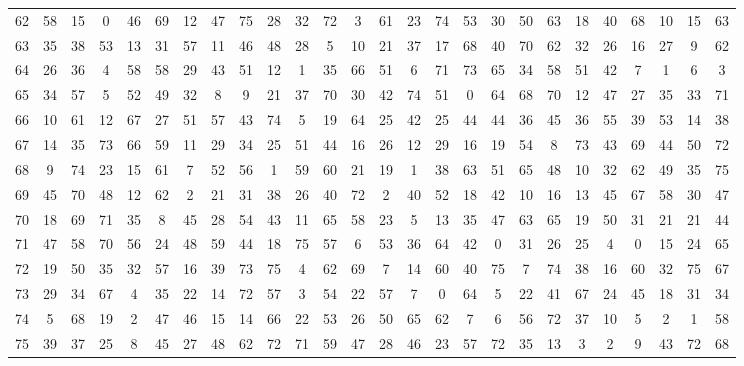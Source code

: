 \begin{table}
\begin{tabular}{c c c c c c c c c c c c c c c c c c c c c c c c c c }
62 & 58 & 15 & 0 & 46 & 69 & 12 & 47 & 75 & 28 & 32 & 72 & 3 & 61 & 23 & 74 & 53 & 30 & 50 & 63 & 18 & 40 & 68 & 10 & 15 & 63 \\
63 & 35 & 38 & 53 & 13 & 31 & 57 & 11 & 46 & 48 & 28 & 5 & 10 & 21 & 37 & 17 & 68 & 40 & 70 & 62 & 32 & 26 & 16 & 27 & 9 & 62 \\
64 & 26 & 36 & 4 & 58 & 58 & 29 & 43 & 51 & 12 & 1 & 35 & 66 & 51 & 6 & 71 & 73 & 65 & 34 & 58 & 51 & 42 & 7 & 1 & 6 & 3 \\
65 & 34 & 57 & 5 & 52 & 49 & 32 & 8 & 9 & 21 & 37 & 70 & 30 & 42 & 74 & 51 & 0 & 64 & 68 & 70 & 12 & 47 & 27 & 35 & 33 & 71 \\
66 & 10 & 61 & 12 & 67 & 27 & 51 & 57 & 43 & 74 & 5 & 19 & 64 & 25 & 42 & 25 & 44 & 44 & 36 & 45 & 36 & 55 & 39 & 53 & 14 & 38 \\
67 & 14 & 35 & 73 & 66 & 59 & 11 & 29 & 34 & 25 & 51 & 44 & 16 & 26 & 12 & 29 & 16 & 19 & 54 & 8 & 73 & 43 & 69 & 44 & 50 & 72 \\
68 & 9 & 74 & 23 & 15 & 61 & 7 & 52 & 56 & 1 & 59 & 60 & 21 & 19 & 1 & 38 & 63 & 51 & 65 & 48 & 10 & 32 & 62 & 49 & 35 & 75 \\
69 & 45 & 70 & 48 & 12 & 62 & 2 & 21 & 31 & 38 & 26 & 40 & 72 & 2 & 40 & 52 & 18 & 42 & 10 & 16 & 13 & 45 & 67 & 58 & 30 & 47 \\
70 & 18 & 69 & 71 & 35 & 8 & 45 & 28 & 54 & 43 & 11 & 65 & 58 & 23 & 5 & 13 & 35 & 47 & 63 & 65 & 19 & 50 & 31 & 21 & 21 & 44 \\
71 & 47 & 58 & 70 & 56 & 24 & 48 & 59 & 44 & 18 & 75 & 57 & 6 & 53 & 36 & 64 & 42 & 0 & 31 & 26 & 25 & 4 & 0 & 15 & 24 & 65 \\
72 & 19 & 50 & 35 & 32 & 57 & 16 & 39 & 73 & 75 & 4 & 62 & 69 & 7 & 14 & 60 & 40 & 75 & 7 & 74 & 38 & 16 & 60 & 32 & 75 & 67 \\
73 & 29 & 34 & 67 & 4 & 35 & 22 & 14 & 72 & 57 & 3 & 54 & 22 & 57 & 7 & 0 & 64 & 5 & 22 & 41 & 67 & 24 & 45 & 18 & 31 & 34 \\
74 & 5 & 68 & 19 & 2 & 47 & 46 & 15 & 14 & 66 & 22 & 53 & 26 & 50 & 65 & 62 & 7 & 6 & 56 & 72 & 37 & 10 & 5 & 2 & 1 & 58 \\
75 & 39 & 37 & 25 & 8 & 45 & 27 & 48 & 62 & 72 & 71 & 59 & 47 & 28 & 46 & 23 & 57 & 72 & 35 & 13 & 3 & 2 & 9 & 43 & 72 & 68 \\
\hline
\end{tabular}
\end{table}